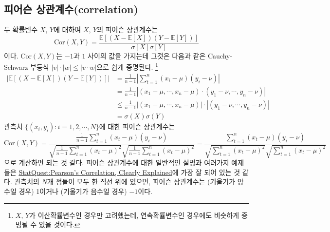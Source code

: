 \documentclass{article}
\begin{document}
\subsection{피어슨 상관계수(correlation)}
두 확률변수 \(X\), \(Y\)에 대하여 \(X\), \(Y\)의 피어슨 상관계수는 
\begin{equation}
\text{Cor}(X,Y)=\frac{\mathbb E[(X-\mathbb E[X])(Y-\mathbb E[Y])]}{\sigma[X]\sigma[Y]}
\end{equation}
이다.
\(\text{Cor}(X,Y)\)는 \(-1\)과 \(1\) 사이의 값을 가지는데 그것은 다음과 같은 Cauchy-Schwarz 부등식 \(|v|\cdot|w|\le|v\cdot w|\)으로 쉽게 증명된다.
\footnote{\(X\), \(Y\)가 이산확률변수인 경우만 고려했는데, 연속확률변수인 경우에도 비슷하게 증명될 수 있을 것이다.}
\begin{align*}
\bigg|\mathbb E\left[\left(X-\mathbb E[X]\right)\left(Y-\mathbb E[Y]\right)\right]\bigg|
&=\frac1{n-1}\left|\sum_{t=1}^n(x_i-\mu)(y_i-\nu)\right|\\
&=\frac1{n-1}\left|(x_1-\mu,\cdots,x_n-\mu)\cdot(y_1-\nu,\cdots,y_n-\nu)\right|\\
&\le\frac1{n-1}\left|(x_1-\mu,\cdots,x_n-\mu)\right|\cdot\left|(y_1-\nu,\cdots,y_n-\nu)\right|\\
&=\sigma(X)\sigma(Y)
\end{align*}
관측치 \(\{(x_i, y_i):i=1,2,\cdots,N\}\)에 대한 피어슨 상관계수는
\[\text{Cor}(X,Y)
=\frac{\frac1{n-1}\sum_{t=1}^n(x_t-\mu)(y_i-\nu)}{\sqrt{\frac1{n-1}\sum_{t=1}^n(x_t-\mu)^2}\sqrt{\frac1{n-1}\sum_{t=1}^n(x_t-\mu)^2}}
=\frac{\sum_{t=1}^n(x_t-\mu)(y_i-\nu)}{\sqrt{\sum_{t=1}^n(x_t-\mu)^2}\sqrt{\sum_{t=1}^n(x_t-\mu)^2}}\]
으로 계산하면 되는 것 같다.
피어슨 상관계수에 대한 일반적인 설명과 여러가지 예제들은 \href{https://youtu.be/xZ_z8KWkhXE}{StatQuest:Pearson's Correlation, Clearly Explained}에 가장 잘 되어 있는 것 같다.
관측치의 \(N\)개 점들이 모두 한 직선 위에 있으면, 피어슨 상관계수는 (기울기가 양수일 경우) 1이거나 (기울기가 음수일 경우) $-1$이다.

\end{document}
